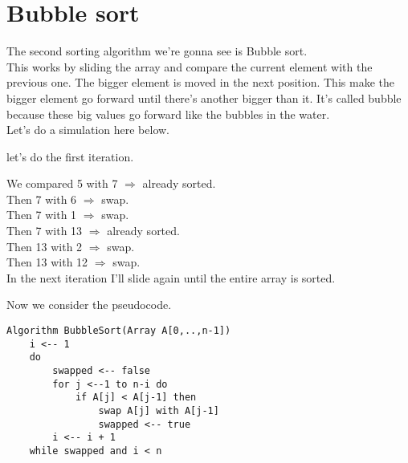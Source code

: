 \documentclass{article}
\begin{document}
\section{Bubble sort}
The second sorting algorithm we're gonna see is Bubble sort.\\
This works by sliding the array and compare the current element with the previous one. The bigger element is moved in the next position. This make the bigger element go forward until there's another bigger than it. It's called bubble because these big values go forward like the bubbles in the water.\\
Let's do a simulation here below.\\


let's do the first iteration.\\



\begin{center}We compared 5 with 7 $\Rightarrow$ already sorted. \\
Then 7 with 6 $\Rightarrow$ swap. \\
Then 7 with 1 $\Rightarrow$ swap. \\
Then 7 with 13 $\Rightarrow$ already sorted. \\
Then 13 with 2 $\Rightarrow$ swap. \\
Then 13 with 12 $\Rightarrow$ swap. \\

In the next iteration I'll slide again until the entire array is sorted.\\ \end{center}

Now we consider the pseudocode.\\

\begin{lstlisting}[caption={\\\textit{Bubble sort algorithm.}}]
Algorithm BubbleSort(Array A[0,..,n-1]) 
	i <-- 1
	do
		swapped <-- false
		for j <--1 to n-i do
			if A[j] < A[j-1] then
				swap A[j] with A[j-1]
				swapped <-- true
		i <-- i + 1
	while swapped and i < n	
\end{lstlisting}
\end{document}
